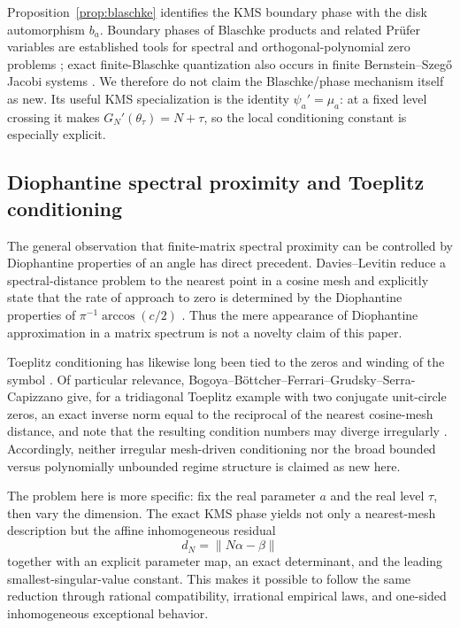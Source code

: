 \documentclass[11pt,reqno]{amsart}
\theoremstyle{plain}
\theoremstyle{definition}
\begin{document}
Proposition~\ref{prop:blaschke} identifies the KMS boundary phase with the disk
automorphism $b_a$.  Boundary phases of Blaschke products and related Pr\"ufer
variables are established tools for spectral and orthogonal-polynomial zero problems
\cite{Simanek2020}; exact finite-Blaschke quantization also occurs in finite
Bernstein--Szeg\H{o} Jacobi systems \cite{vanDiejenEmsiz2018}.  We therefore do
not claim the Blaschke/phase mechanism itself as new.  Its useful KMS specialization
is the identity $\psi_a'=\mu_a$: at a fixed level crossing it makes
$G_N'(\theta_\tau)=N+\tau$, so the local conditioning constant is especially
explicit.

\subsection*{Diophantine spectral proximity and Toeplitz conditioning}
The general observation that finite-matrix spectral proximity can be controlled by
Diophantine properties of an angle has direct precedent.  Davies--Levitin reduce a
spectral-distance problem to the nearest point in a cosine mesh and explicitly state
that the rate of approach to zero is determined by the Diophantine properties of
$\pi^{-1}\arccos(c/2)$ \cite{DaviesLevitin2014}.  Thus the mere appearance of
Diophantine approximation in a matrix spectrum is not a novelty claim of this paper.

Toeplitz conditioning has likewise long been tied to the zeros and winding of the
symbol \cite{AmodioBrugnano1996,BottcherGrudsky1999,Garoni2013}.  Of particular
relevance, Bogoya--B\"ottcher--Ferrari--Grudsky--Serra-Capizzano give, for a
tridiagonal Toeplitz example with two conjugate unit-circle zeros, an exact inverse
norm equal to the reciprocal of the nearest cosine-mesh distance, and note that the
resulting condition numbers may diverge irregularly \cite{BogoyaEtAl2026}.
Accordingly, neither irregular mesh-driven conditioning nor the broad bounded versus
polynomially unbounded regime structure is claimed as new here.

The problem here is more specific: fix the real parameter $a$ and the real level
$\tau$, then vary the dimension.  The exact KMS phase yields not only a nearest-mesh
description but the affine inhomogeneous residual
\[
d_N=\|N\alpha-\beta\|
\]
together with an explicit parameter map, an exact determinant, and the leading
smallest-singular-value constant.  This makes it possible to follow the same
reduction through rational compatibility, irrational empirical laws, and one-sided
inhomogeneous exceptional behavior.
\end{document}
